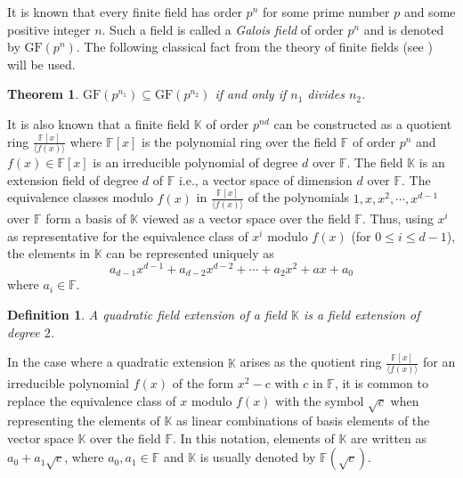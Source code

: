 \documentclass[11pt]{amsart}
\newcommand{\GF}{\mathrm{GF}}
\newtheorem{definition}{{\bf Definition}}
\newtheorem{theorem}{{\bf Theorem }}
\begin{document}
It is known that every finite field has order $p^n$ for some prime number $p$ and some positive integer $n$. Such a field is called  a \emph {Galois field} of order $p^n$ and is denoted by $\GF(p^n)$. The following classical fact from the theory of finite fields (see \cite {G}) will be used.
\begin{theorem}\label{fieldorderthm}
$\GF(p^{n_1})\subseteq \GF(p^{n_2})$ if and only if $n_1$ divides $n_2$.
\end{theorem}
It is also known that a finite field ${\mathbb K}$ of order $p^{nd}$ can be constructed as a quotient ring $\frac{{\mathbb F}[x]}{\langle f(x)\rangle}$ where ${\mathbb F}[x]$ is the polynomial ring over the field ${\mathbb F}$ of order $p^n$ and $f(x)\in {\mathbb F}[x]$ is an irreducible polynomial of degree $d$ over ${\mathbb F}$. The field ${\mathbb K}$ is an extension field of degree $d$ of ${\mathbb F}$ i.e., a vector space of dimension $d$ over ${\mathbb F}$. The equivalence classes modulo $f(x)$ in $\frac{{\mathbb F}[x]}{\langle f(x)\rangle}$ of the polynomials $1,x,x^2,\cdots, x^{d-1}$ over ${\mathbb F}$ form a basis of ${\mathbb K}$ viewed as a vector space over the field ${\mathbb F}$.  Thus, using $x^i$ as representative for the equivalence class of $x^i$ modulo $f(x)$ (for $0\le i\le d-1$), the elements in $\mathbb K$ can be represented uniquely as 
\[
a_{d-1}x^{d-1}+ a_{d-2}x^{d-2}+\cdots+a_{2}x^{2}+ax+a_0 
\]
where $a_i\in {\mathbb F}$.
\begin{definition}
A \emph{quadratic field extension} of a field ${\mathbb K}$ is a field extension of degree $2$.
\end{definition}
In the case where a quadratic extension ${\mathbb K}$ arises as the quotient ring $\frac{{\mathbb F}[x]}{\langle f(x)\rangle}$ for an irreducible polynomial $f(x)$ of the form $x^2-c$ with $c$ in ${\mathbb F}$, it is common to replace the equivalence class of $x$ modulo $f(x)$ with the symbol $\sqrt{c}$ when representing the elements of ${\mathbb K}$ as linear combinations of basis elements of the vector space ${\mathbb K}$ over the field ${\mathbb F}$. In this notation, elements of ${\mathbb K}$ are written as $a_0+a_1\sqrt{c}$, where $a_0,a_1 \in \mathbb F$ and ${\mathbb K}$ is usually denoted by $\mathbb F(\sqrt{c})$.
\end{document}
